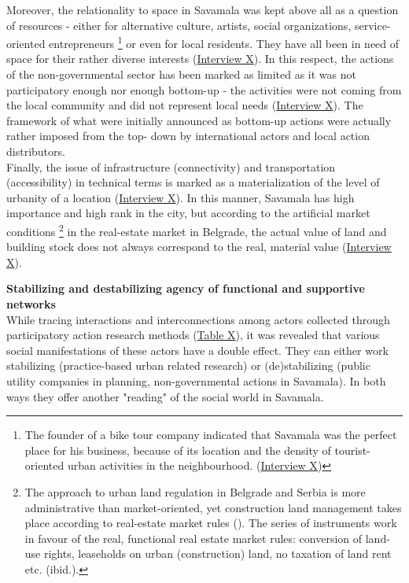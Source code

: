 \documentclass[11pt]{report}
\begin{document}
Moreover, the relationality to space in Savamala was kept above all as a question of resources - either for alternative culture, artists, social organizations, service-oriented entrepreneurs
\footnote{The founder of a bike tour company indicated that Savamala was the perfect place for his business, because of its location and the density of tourist-oriented urban activities in the neighbourhood. (\href{InterviewX}{Interview X})}
or even for local residents.
They have all been in need of space for their rather diverse interests (\href{InterviewX}{Interview X}).
In this respect, the actions of the non-governmental sector has been marked as limited as it was not  participatory enough nor enough bottom-up - the activities were not coming from the local community and did not represent local needs (\href{InterviewX}{Interview X}).
The framework of what were initially announced as bottom-up actions were actually rather imposed from the top- down by international actors and local action distributors.
\\

Finally, the issue of infrastructure (connectivity) and transportation (accessibility) in technical terms is marked as a materialization of the level of urbanity of a location (\href{InterviewX}{Interview X}).
In this manner, Savamala has high importance and high rank in the city, but according to the artificial market conditions
\footnote{
The approach to urban land regulation in Belgrade and Serbia is more administrative than market-oriented, yet construction land management takes place according to real-estate market rules (\href{Zekovic}{\citealt{zekovic_spatial_2015}}).
The series of instruments work in favour of the real, functional real estate market rules: conversion of land-use rights, leaseholds on urban (construction) land, no taxation of land rent etc. (ibid.).}
in the real-estate market in Belgrade, the actual value of land and building stock does not always correspond to the real, material value (\href{InterviewX}{Interview X}).

\textbf{Stabilizing and destabilizing agency of functional and supportive networks}
\\
While tracing interactions and interconnections among actors collected through participatory action research methods (\href{Table 3 Savamala PUD}{Table X}), it was revealed that various social manifestations of these actors have a double effect. They can either work stabilizing (practice-based urban related research) or (de)stabilizing (public utility  companies in planning, non-governmental actions in Savamala). In both ways they offer another  "reading" of the social world in Savamala.
\\
\end{document}
